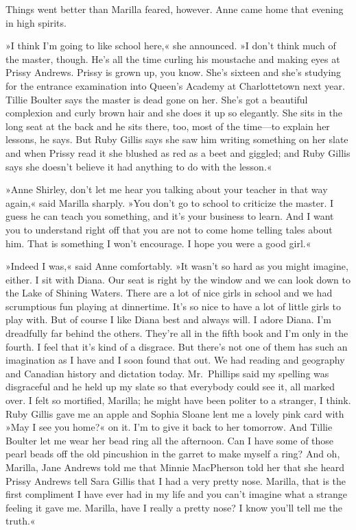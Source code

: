 Things went better than Marilla feared, however. Anne came home that evening in high spirits.

»I think I'm going to like school here,« she announced. »I don't think much of the master, though. He's all the time curling his moustache and making eyes at Prissy Andrews. Prissy is grown up, you know. She's sixteen and she's studying for the entrance examination into Queen's Academy at Charlottetown next year. Tillie Boulter says the master is dead gone on her. She's got a beautiful complexion and curly brown hair and she does it up so elegantly. She sits in the long seat at the back and he sits there, too, most of the time—to explain her lessons, he says. But Ruby Gillis says she saw him writing something on her slate and when Prissy read it she blushed as red as a beet and giggled; and Ruby Gillis says she doesn't believe it had anything to do with the lesson.«

»Anne Shirley, don't let me hear you talking about your teacher in that way again,« said Marilla sharply. »You don't go to school to criticize the master. I guess he can teach you something, and it's your business to learn. And I want you to understand right off that you are not to come home telling tales about him. That is something I won't encourage. I hope you were a good girl.«

»Indeed I was,« said Anne comfortably. »It wasn't so hard as you might imagine, either. I sit with Diana. Our seat is right by the window and we can look down to the Lake of Shining Waters. There are a lot of nice girls in school and we had scrumptious fun playing at dinnertime. It's so nice to have a lot of little girls to play with. But of course I like Diana best and always will. I adore Diana. I'm dreadfully far behind the others. They're all in the fifth book and I'm only in the fourth. I feel that it's kind of a disgrace. But there's not one of them has such an imagination as I have and I soon found that out. We had reading and geography and Canadian history and dictation today. Mr.~Phillips said my spelling was disgraceful and he held up my slate so that everybody could see it, all marked over. I felt so mortified, Marilla; he might have been politer to a stranger, I think. Ruby Gillis gave me an apple and Sophia Sloane lent me a lovely pink card with »May I see you home?« on it. I'm to give it back to her tomorrow. And Tillie Boulter let me wear her bead ring all the afternoon. Can I have some of those pearl beads off the old pincushion in the garret to make myself a ring? And oh, Marilla, Jane Andrews told me that Minnie MacPherson told her that she heard Prissy Andrews tell Sara Gillis that I had a very pretty nose. Marilla, that is the first compliment I have ever had in my life and you can't imagine what a strange feeling it gave me. Marilla, have I really a pretty nose? I know you'll tell me the truth.«

